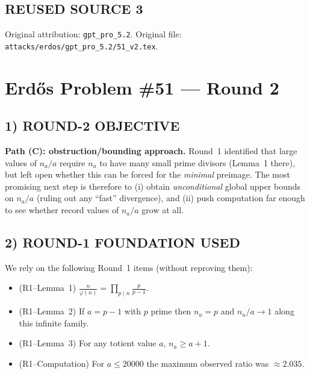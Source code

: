 
\subsection*{REUSED SOURCE 3}
Original attribution: \texttt{gpt\_pro\_5.2}.
Original file: \texttt{attacks/erdos/gpt\_pro\_5.2/51\_v2.tex}.

\section{Erd\H{o}s Problem \#51 --- Round 2}

\subsection*{1) ROUND-2 OBJECTIVE}
\textbf{Path (C): obstruction/bounding approach.}
Round~1 identified that large values of $n_a/a$ require $n_a$ to have many small prime divisors (Lemma~1 there), but left open whether this can be forced for the \emph{minimal} preimage.
The most promising next step is therefore to (i) obtain \emph{unconditional} global upper bounds on $n_a/a$ (ruling out any ``fast'' divergence), and (ii) push computation far enough to see whether record values of $n_a/a$ grow at all.

\subsection*{2) ROUND-1 FOUNDATION USED}
We rely on the following Round~1 items (without reproving them):
\begin{itemize}
\item (R1--Lemma~1) $\displaystyle \frac{n}{\varphi(n)}=\prod_{p\mid n}\frac{p}{p-1}$.
\item (R1--Lemma~2) If $a=p-1$ with $p$ prime then $n_a=p$ and $n_a/a\to 1$ along this infinite family.
\item (R1--Lemma~3) For any totient value $a$, $n_a\ge a+1$.
\item (R1--Computation) For $a\le 20000$ the maximum observed ratio was $\approx 2.035$.
\end{itemize}


